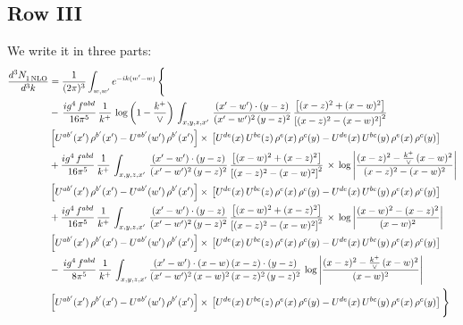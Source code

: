 \documentclass[9pt]{article}
\numberwithin{equation}{section}
\begin{document}
\subsection{Row III}
We write it in three parts:
\begin{align}
   \frac{d^{3}N_{1\,\rm NLO}^{\rm}}{d^{3}k}  & =  \frac{1}{(2\pi)^{3}}  \int_{w, w^\prime} e^{-ik(w^\prime-w)}\, \Bigg\{\notag \\
& -\,\frac{ig^{4}\,f^{abd}}{16\pi^{5}}\,\frac{1}{k^{+}}\,\log{\left(1-\frac{k^{+}}{\vee}\right)}\,\int_{x,y,z,x'}\, \frac{(x'-w')\cdot (y-z)}{(x'-w')^{2}\,(y-z)^{2}}\,\frac{\left[(x-z)^{2}+(x-w)^{2}\right]}{\left[(x-z)^{2}-(x-w)^{2}\right]^{2}}\notag \\ & \left[U^{ab'}(x')\,\rho^{b'}(x')-U^{ab'}(w')\, \rho^{b'}(x')\right]\times\, \left[U^{de}(x)\,U^{bc}(z)\, \rho^{e}(x)\,\rho^{c}(y)-U^{de}(x)\,U^{bc}(y)\,\rho^{e}(x)\,\rho^{c}(y)\right] \notag \\
&  +\frac{ig^{4}\,f^{abd}}{16\pi^{5}}\, \frac{1}{k^{+}}\,\int_{x,y,z,x'}\, \frac{(x'-w')\cdot (y-z)}{(x'-w')^{2}\,(y-z)^{2}}\, \frac{\left[(x-w)^{2}+(x-z)^{2}\right]}{\left[(x-z)^{2}-(x-w)^{2}\right]^{2}}\, \times\, \log{\left|\frac{(x-z)^{2}-\frac{k^{+}}{\vee}\,(x-w)^{2}}{(x-z)^{2}-(x-w)^{2}}\right|}\notag \\ & \left[U^{ab'}(x')\,\rho^{b'}(x')-U^{ab'}(w')\, \rho^{b'}(x')\right]\times\, \left[U^{de}(x)\,U^{bc}(z)\, \rho^{e}(x)\,\rho^{c}(y)-U^{de}(x)\,U^{bc}(y)\,\rho^{e}(x)\,\rho^{c}(y)\right] \notag \\
&  +\frac{ig^{4}\,f^{abd}}{16\pi^{5}}\, \frac{1}{k^{+}}\,\int_{x,y,z,x'}\, \frac{(x'-w')\cdot (y-z)}{(x'-w')^{2}\,(y-z)^{2}}\, \frac{\left[(x-w)^{2}+(x-z)^{2}\right]}{\left[(x-z)^{2}-(x-w)^{2}\right]^{2}}\, \times\, \log{\left|\frac{(x-w)^{2}-(x-z)^{2}}{(x-w)^{2}}\right|}\notag \\ & \left[U^{ab'}(x')\,\rho^{b'}(x')-U^{ab'}(w')\, \rho^{b'}(x')\right]\times\, \left[U^{de}(x)\,U^{bc}(z)\, \rho^{e}(x)\,\rho^{c}(y)-U^{de}(x)\,U^{bc}(y)\,\rho^{e}(x)\,\rho^{c}(y)\right] \notag \\
&-\, \frac{ig^{4}\,f^{abd}}{8\pi^{5}}\,\frac{1}{k^{+}}\,\int_{x,y,z,x'}\frac{(x'-w')\cdot (x-w)\, (x-z)\cdot (y-z)}{(x'-w')^{2}\, (x-w)^{2}\, (x-z)^{2}\, (y-z)^{2}}\,\log{\left|\frac{(x-z)^{2}-\frac{k^{+}}{\vee}\,(x-w)^{2}}{(x-w)^{2}}\right|} \notag \\ & \left[U^{ab'}(x')\,\rho^{b'}(x')-U^{ab'}(w')\, \rho^{b'}(x')\right]\times\, \left[U^{de}(x)\,U^{bc}(z)\, \rho^{e}(x)\,\rho^{c}(y)-U^{de}(x)\,U^{bc}(y)\,\rho^{e}(x)\,\rho^{c}(y)\right]\Bigg\}
\end{align}
\end{document}
